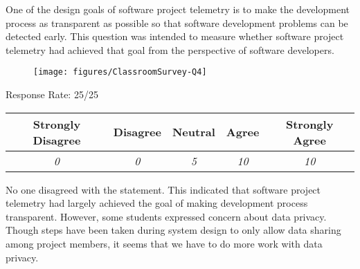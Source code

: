 One of the design goals of software project telemetry is to make the development process as transparent as possible so that software development problems can be detected early. This question was intended to measure whether software project telemetry had achieved that goal from the perspective of software developers.

\begin{quote}\end{quote} %

\begin{figure}[h]
  \center
  \texttt{[image: figures/ClassroomSurvey-Q4]}
  \label{fig:InClassSurvey-Q4}
\end{figure}

\begin{center}Response Rate: 25/25\end{center}
\begin{table}[h]
	\centering
		\begin{tabular}{|c|c|c|c|c|} 
			\hline
			\textbf{Strongly Disagree} & \textbf{Disagree} & \textbf{Neutral} & \textbf{Agree} & \textbf{Strongly Agree} \\
			\hline
			\textit{0} & \textit{0} & \textit{5} & \textit{10} &\textit{10} \\
			\hline
		\end{tabular}
	\label{table:InClassSurvey-Q4}
\end{table}

%

No one disagreed with the statement. This indicated that software project telemetry had largely achieved the goal of making development process transparent. However, some students expressed concern about data privacy. Though steps have been taken during system design to only allow data sharing among project members, it seems that we have to do more work with data privacy.


